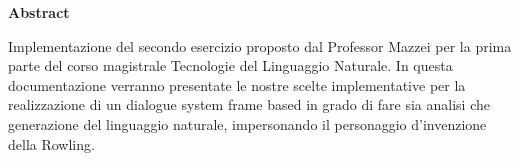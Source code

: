 \small
\noindent\textbf{Abstract}

Implementazione del secondo esercizio proposto dal Professor Mazzei per la prima parte del corso magistrale Tecnologie del Linguaggio Naturale. In questa documentazione verranno presentate le nostre scelte implementative per la realizzazione di un dialogue system frame based in grado di fare sia analisi che generazione del linguaggio naturale, impersonando il personaggio d'invenzione della Rowling.  